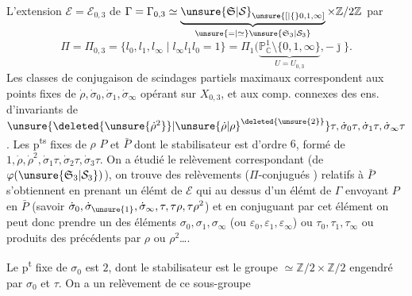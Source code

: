 L'extension $\mathcal E=\mathcal E_{0,3}$ de $\Gamma=\Gamma_{0,3}\simeq\underbrace{\unsure{\mathfrak S|\mathcal S}_{\unsure{[|\{}0,1,\infty]}}_{\unsure{=|\simeq}\unsure{\mathfrak S_3|\mathcal S_3}}\times\mathbb Z/2\mathbb Z$
par
\[
\Pi=\Pi_{0,3}=\{l_0,l_1,l_\infty\mid l_\infty l_1l_0=1\}=\Pi_1(\underbrace{\mathbb P^1_{\mathbb C}\setminus\{0,1,\infty\}}_{U=U_{0,3}},-\bar{\jmath}\}.
\]
Les classes de conjugaison  de scindages partiels maximaux correspondent aux points fixes de $\dot\rho,\dot\sigma_0,\dot\sigma_1,\dot\sigma_\infty$ opérant sur $X_{0,3}$, et  aux comp. connexes des ens. d'invariants de $\unsure{\deleted{\unsure{\dot\rho^2}}|\unsure{\dot\rho|\rho}^{\deleted{\unsure{2}}}}\tau,\dot\sigma_0\tau,\dot\sigma_1\tau,\dot\sigma_\infty\tau$. Les p\textsuperscript{ts} fixes de $\rho$  $P$ et $\bar P$ dont le stabilisateur est d'ordre $6$,  formé de $1,\dot\rho,\dot\rho^2,\dot\sigma_1\tau,\dot\sigma_2\tau,\dot\sigma_3\tau$. On a étudié le relèvement correspondant  (de $\varphi(\unsure{\mathfrak S_3|\mathcal S_3})$), on trouve des relèvements ($\Pi$-conjugués ) relatifs à $\bar P$ s'obtiennent en  prenant un élémt de $\mathcal E$  qui  au dessus d'un élémt de $\Gamma$ envoyant $P$ en $\bar P$ (savoir $\dot\sigma_0,\dot\sigma_{\unsure{1}},\dot\sigma_\infty,\tau,\tau\rho,\tau\rho^2$) et en conjuguant par cet élément on peut donc prendre  un des éléments $\sigma_0,\sigma_1,\sigma_\infty$ (ou $\varepsilon_0,\varepsilon_1,\varepsilon_\infty$) ou $\tau_0,\tau_1,\tau_\infty$ ou  produits des précédents par  $\rho$ ou $\rho^2$\ldots.

Le  p\textsuperscript{t} fixe de $\sigma_0$ est $2$, dont le stabilisateur est le groupe $\simeq\mathbb Z/2\times\mathbb Z/2$ engendré par $\sigma_0$ et $\tau$. On a un relèvement de ce sous-groupe
